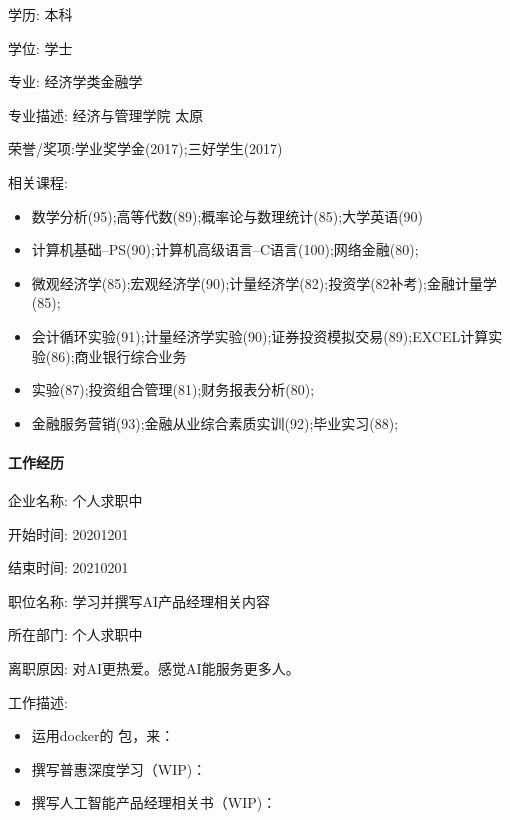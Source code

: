 \documentclass[letterpaper,11pt,english]{sphinxmanual}
\begin{document}
学历: 本科

学位: 学士

专业: 经济学类\sphinxhyphen{}金融学

专业描述: 经济与管理学院 太原

荣誉/奖项:学业奖学金(2017);三好学生(2017)

相关课程:
\begin{itemize}
\item {} 
数学分析(95);高等代数(89);概率论与数理统计(85);大学英语(90)

\item {} 
计算机基础–PS(90);计算机高级语言–C语言(100);网络金融(80);

\item {} 
微观经济学(85);宏观经济学(90);计量经济学(82);投资学(82补考);金融计量学(85);

\item {} 
会计循环实验(91);计量经济学实验(90);证券投资模拟交易(89);EXCEL计算实验(86);商业银行综合业务

\item {} 
实验(87);投资组合管理(81);财务报表分析(80);

\item {} 
金融服务营销(93);金融从业综合素质实训(92);毕业实习(88);

\end{itemize}


\paragraph{工作经历}
\label{\detokenize{get_started:id4}}
企业名称: 个人求职中

开始时间: 2020\sphinxhyphen{}12\sphinxhyphen{}01

结束时间: 2021\sphinxhyphen{}02\sphinxhyphen{}01

职位名称: 学习并撰写AI产品经理相关内容

所在部门: 个人求职中

离职原因: 对AI更热爱。感觉AI能服务更多人。

工作描述:
\begin{itemize}
\item {} 
运用docker的  包，来：

\item {} 
撰写普惠深度学习（WIP)：

\item {} 
撰写人工智能产品经理相关书（WIP)：

\end{itemize}
\end{document}
